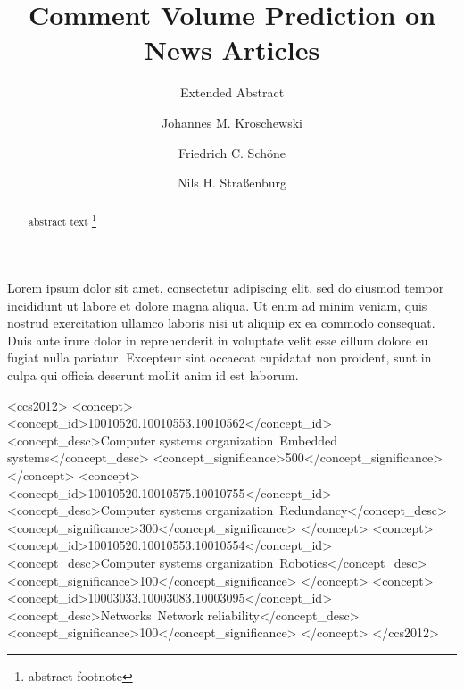 \documentclass[10pt,sigconf]{acmart}
\begin{document}
\title{Comment Volume Prediction on News Articles}
\subtitle{Extended Abstract} %

\author{Johannes M. Kroschewski}

\author{Friedrich C. Schöne}

\author{Nils H. Straßenburg}

\renewcommand{\shortauthors}{M. Kroschewski et al.}


\begin{abstract}
	abstract text \footnote{abstract footnote}
\end{abstract}
Lorem ipsum dolor sit amet, consectetur adipiscing elit, sed do eiusmod tempor incididunt ut labore et dolore magna aliqua. Ut enim ad minim veniam, quis nostrud exercitation ullamco laboris nisi ut aliquip ex ea commodo consequat. Duis aute irure dolor in reprehenderit in voluptate velit esse cillum dolore eu fugiat nulla pariatur. Excepteur sint occaecat cupidatat non proident, sunt in culpa qui officia deserunt mollit anim id est laborum.
%
%
\begin{CCSXML}
<ccs2012>
 <concept>
  <concept_id>10010520.10010553.10010562</concept_id>
  <concept_desc>Computer systems organization~Embedded systems</concept_desc>
  <concept_significance>500</concept_significance>
 </concept>
 <concept>
  <concept_id>10010520.10010575.10010755</concept_id>
  <concept_desc>Computer systems organization~Redundancy</concept_desc>
  <concept_significance>300</concept_significance>
 </concept>
 <concept>
  <concept_id>10010520.10010553.10010554</concept_id>
  <concept_desc>Computer systems organization~Robotics</concept_desc>
  <concept_significance>100</concept_significance>
 </concept>
 <concept>
  <concept_id>10003033.10003083.10003095</concept_id>
  <concept_desc>Networks~Network reliability</concept_desc>
  <concept_significance>100</concept_significance>
 </concept>
</ccs2012>  
\end{CCSXML}
\end{document}

